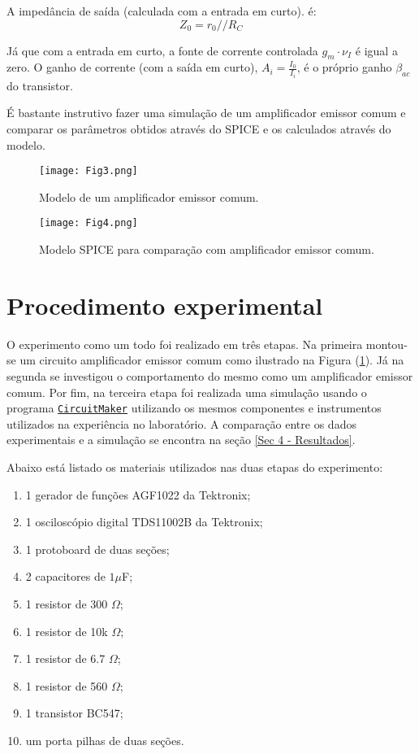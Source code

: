 \documentclass[letterpaper, 12pt]{article}
\begin{document}
A impedância de saída (calculada com a entrada em curto). é:
\begin{equation}
    Z_{0}=r_{0}//R_{C}
\end{equation}

Já que com a entrada em curto, a fonte de corrente controlada $g_{m}\cdot \nu_{I}$ é igual a zero. O ganho de corrente (com a saída em curto), $A_{i}=\frac{I_{0}}{I_{i}}$, é o próprio ganho $\beta_{ac}$ do transistor.

É bastante instrutivo fazer uma simulação de um amplificador emissor comum e comparar os parâmetros obtidos através do SPICE e os calculados através do modelo.

\begin{figure}[h]
    \centering
    \texttt{[image: Fig3.png]}
    \caption{Modelo de um amplificador emissor comum.}
    \label{fig:Fig3}
\end{figure}

\begin{figure}[h]
    \centering
    \texttt{[image: Fig4.png]}
    \caption{Modelo SPICE para comparação com amplificador emissor comum.}
    \label{fig:Fig4}
\end{figure}




\section{Procedimento experimental}\label{Sec 3 - Experimento}
O experimento como um todo foi realizado em três etapas. Na primeira montou-se um circuito amplificador emissor comum como ilustrado na Figura (\ref{fig:Fig3}). Já na segunda se investigou o comportamento do mesmo como um amplificador emissor comum. Por fim, na terceira etapa foi realizada uma simulação usando o programa \href{https://docente.ifrn.edu.br/leonardoteixeira/links/instalador-do-circuitmaker-student/view}{\texttt{CircuitMaker}} utilizando os mesmos componentes e instrumentos utilizados na experiência no laboratório. A comparação entre os dados experimentais e a simulação se encontra na seção \ref{Sec 4 - Resultados}. 

Abaixo está listado os materiais utilizados nas duas etapas do experimento:
\begin{enumerate}
    \item 1 gerador de funções AGF1022 da Tektronix;
    \item 1 osciloscópio digital TDS11002B da Tektronix;
    \item 1 protoboard de duas seções;
    \item 2 capacitores de $1\mu$F;
    \item 1 resistor de 300 $\Omega$;
    \item 1 resistor de 10k $\Omega$;
    \item 1 resistor de 6.7 $\Omega$;
    \item 1 resistor de 560 $\Omega$;
    \item 1 transistor BC547;
    \item um porta pilhas de duas seções.
\end{enumerate}
\end{document}
